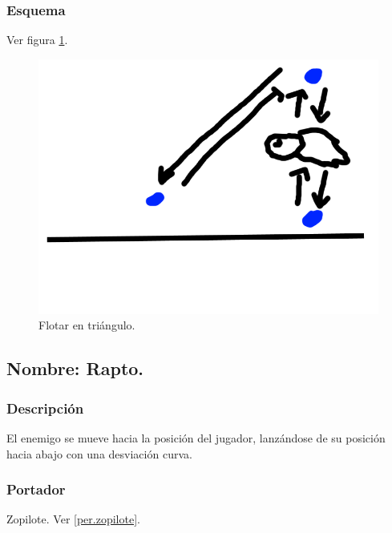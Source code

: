 \documentclass[11pt,letterpaper]{article}
\begin{document}
		\subsubsection{Esquema}
		Ver figura \ref{fig:flotarT}.
		\begin{figure}
			\centering
			\includegraphics[height=0.2 \textheight]{Imagenes/flotarT}
			\caption{Flotar en triángulo.}
			\label{fig:flotarT}
		\end{figure}
	\subsection{Nombre: Rapto.} \label{hab.rapto}
		\subsubsection{Descripción}
		El enemigo se mueve hacia la posición del jugador, lanzándose de su posición hacia abajo con una desviación curva.
		\subsubsection{Portador}
		Zopilote. Ver \ref{per.zopilote}.
\end{document}
